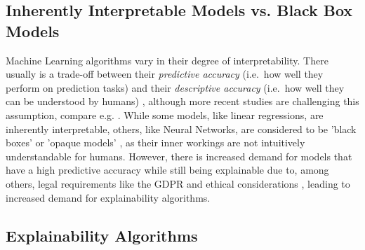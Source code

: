 \subsection{Inherently Interpretable Models vs. Black Box Models}\label{subsec:inherently}

Machine Learning algorithms vary in their degree of interpretability. There usually is a trade-off between their \textit{predictive accuracy} (i.e.\ how well they perform on prediction tasks) and their \textit{descriptive accuracy} (i.e.\ how well they can be understood by humans) \parencite{Murdoch2019}, although more recent studies are challenging this assumption, compare e.g. \cite{Cooper2024}.
While some models, like linear regressions, are inherently interpretable, others, like Neural Networks, are considered to be 'black boxes' \parencite{Guidotti2018} or 'opaque models' \parencite{Burrell2016}, as their inner workings are not intuitively understandable for humans.
However, there is increased demand for models that have a high predictive accuracy while still being explainable due to, among others, legal requirements like the GDPR \parencite{GDPR} and ethical considerations \parencite{Guidotti2018}, leading to increased demand for explainability algorithms.

\subsection{Explainability Algorithms}\label{subsec:algorithms}

